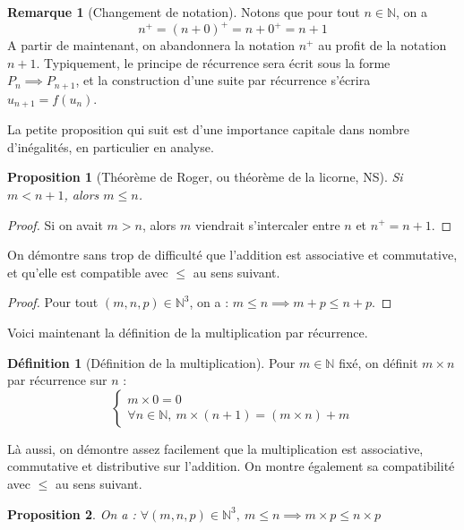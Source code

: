 \documentclass[french]{book}
\newcommand{\N}{\mathbb{N}}
\theoremstyle{plain}
\newtheorem{prop}{Proposition}[chapter]
\theoremstyle{definition}
\newtheorem{dfn}{Définition}[chapter]
\newtheorem{rmq}{Remarque}[chapter]
\theoremstyle{remark}
\begin{document}
\begin{rmq}[Changement de notation]
	Notons que pour tout $n\in\N$, on a $$n^+=(n+0)^+=n+0^+=n+1$$ A partir de maintenant, on abandonnera la notation $n^+$ au profit de la notation $n+1$. Typiquement, le principe de récurrence sera écrit sous la forme $P_n\implies P_{n+1}$, et la construction d'une suite par récurrence s'écrira $u_{n+1}=f(u_n)$.
\end{rmq}
La petite proposition qui suit est d'une importance capitale dans nombre d'inégalités, en particulier en analyse.
\begin{prop}[Théorème de Roger, ou théorème de la licorne, NS]
	Si $m<n+1$, alors $m\leqslant n$.
\end{prop}
\begin{proof}
	Si on avait $m>n$, alors $m$ viendrait s'intercaler entre $n$ et $n^+=n+1$.
\end{proof}
On démontre sans trop de difficulté que l'addition est associative et commutative, et qu'elle est compatible avec $\leqslant$ au sens suivant.
\begin{proof}
	Pour tout $(m,n,p)\in\N^3$, on a : $m\leqslant n \implies m+p\leqslant n+p$.
\end{proof}
Voici maintenant la définition de la multiplication par récurrence.
\begin{dfn}[Définition de la multiplication]
	Pour $m\in\N$ fixé, on définit $m\times n$ par récurrence sur $n$ :$$\left \{ \begin{array}{ll}
		m\times0=0 \\ \forall n\in\N,\ m\times (n+1)=(m\times n)+m
	\end{array} \right.$$
\end{dfn}
Là aussi, on démontre assez facilement que la multiplication est associative, commutative et distributive sur l'addition. On montre également sa compatibilité avec $\leqslant$ au sens suivant.
\begin{prop}
	On a : $\forall (m,n,p)\in\N^3,\ m\leqslant n\implies m\times p\leqslant n\times p$
\end{prop}
\end{document}
